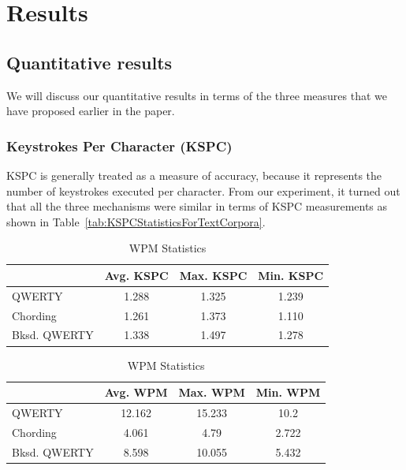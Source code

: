 \section{Results}
\subsection{Quantitative results}

We will discuss our quantitative results in terms of the three
measures that we have proposed earlier in the paper.

\subsubsection{Keystrokes Per Character (KSPC)}

KSPC is generally treated as a measure of accuracy, because it
represents the number of keystrokes executed per character. From our
experiment, it turned out that all the three mechanisms were similar
in terms of KSPC measurements as shown in
Table~\ref{tab:KSPCStatisticsForTextCorpora}.

\begin{table}
\begin{minipage}[b]{0.5\linewidth}
	\centering
		\begin{tabular}{|l|c|c|c|} \hline
		                         & Avg. KSPC & Max. KSPC & Min. KSPC \\ \hline
			 QWERTY & 1.288 & 1.325 & 1.239 \\ \hline
			 Chording & 1.261 & 1.373 & 1.110 \\ \hline
			 Bksd. QWERTY & 1.338 & 1.497 & 1.278 \\ \hline
		\end{tabular}
	\caption{KSPC Statistics}
	\label{tab:KSPCStatisticsForTextCorpora}
\end{minipage}	
\begin{minipage}[b]{0.5\linewidth}
	\centering
		\begin{tabular}{|l|c|c|c|} \hline
		                         & Avg. WPM & Max. WPM & Min. WPM \\ \hline
			 QWERTY & 12.162 & 15.233 & 10.2 \\ \hline
			 Chording & 4.061 & 4.79 & 2.722 \\ \hline
			 Bksd. QWERTY & 8.598 & 10.055 & 5.432 \\ \hline
		\end{tabular}
	\caption{WPM Statistics}
	\label{tab:WPMStatisticsForTextCorpora}
\end{minipage}
\end{table}

